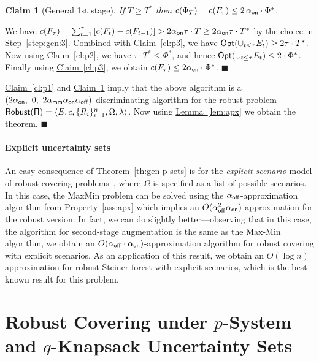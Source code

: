 \documentclass[11pt,letterpaper]{article}
\newcommand{\lref}[2][]{\hyperref[#2]{#1~\ref*{#2}}}
\newtheorem{claim}[theorem]{Claim}
\newenvironment{Myquote}{\par\begingroup
\addtolength{\leftskip}{1em} \rightskip\leftskip }{\par
\endgroup
}
\newenvironment{proof}{

\noindent{\bf Proof:}} {\hfill$\blacksquare$


}
\def\opt{{\sf Opt}\xspace}
\def\cov{\ensuremath{\Pi}\xspace}
\def\rcov{{\sf Robust(\cov)}\xspace}
\def\mm{{\sf MaxMin}\xspace}
\def\fst{\ensuremath {\Phi_T}\xspace}
\newcommand{\offline}{\alpha_{\sf off}}
\newcommand{\online}{\alpha_{\sf on}}
\newcommand{\Tstar}{\ensuremath{T^*}\xspace}
\newcommand{\Phistar}{\ensuremath{\Phi^*}\xspace}
\begin{document}
\begin{proof}
\begin{Myquote}
\begin{claim}[General 1st stage]\label{cl:p4}
If $T\ge \Tstar$ then $c(\fst)=c(F_\tau)\le 2\,\online\cdot \Phistar$.
\end{claim}
\begin{proof}
We have $c(F_\tau)= \sum_{t=1}^\tau \left[ c(F_t)- c(F_{t-1})\right] > 2\online\tau\cdot T\ge 2\online\tau\cdot \Tstar$
by the choice in Step~\eqref{step:gen:3}. Combined with \lref[Claim]{cl:p3}, we have $\opt(\cup_{t\le \tau} E_t)\ge
2\tau\cdot \Tstar$. Now using \lref[Claim]{cl:p2}, we have $\tau\cdot \Tstar\le \Phistar$, and hence $\opt(\cup_{t\le
\tau} E_t)\le 2\cdot \Phistar$. Finally using \lref[Claim]{cl:p3}, we obtain $c(F_\tau)\le 2\online\cdot \Phistar$.
\end{proof}
\end{Myquote}

\lref[Claim]{cl:p1} and \lref[Claim]{cl:p4} imply that the above algorithm is a
$(2\online,~0,~2\mapx\online\offline)$-discriminating algorithm for the robust problem $\rcov=\langle E,c,
\{R_i\}_{i=1}^n, \Omega,\lambda \rangle$. Now using \lref[Lemma]{lem:apx} we obtain the theorem.
\end{proof}


\paragraph{Explicit uncertainty sets} An easy consequence of \lref[Theorem]{th:gen-p-sets} is for the {\em  explicit scenario} model of robust covering
problems~\cite{DGRS05,GGR06}, where $\Omega$ is specified as a list of possible scenarios. In this case, the \mm
problem can be solved using the $\offline$-approximation algorithm from \lref[Property]{ass:apx} which implies an
$O(\offline^2\online)$-approximation for the robust version. In fact, we can do slightly better---observing that in
this  case, the algorithm for second-stage augmentation is the same as the Max-Min algorithm, we obtain an
$O(\offline\cdot \online)$-approximation algorithm for robust covering with explicit scenarios. As an application of
this result, we obtain an $O(\log n)$ approximation for robust Steiner forest with explicit scenarios, which is the
best known result for this problem.


\section{Robust Covering under $p$-System and $q$-Knapsack Uncertainty
  Sets}
\label{sec:combine}
\end{document}
